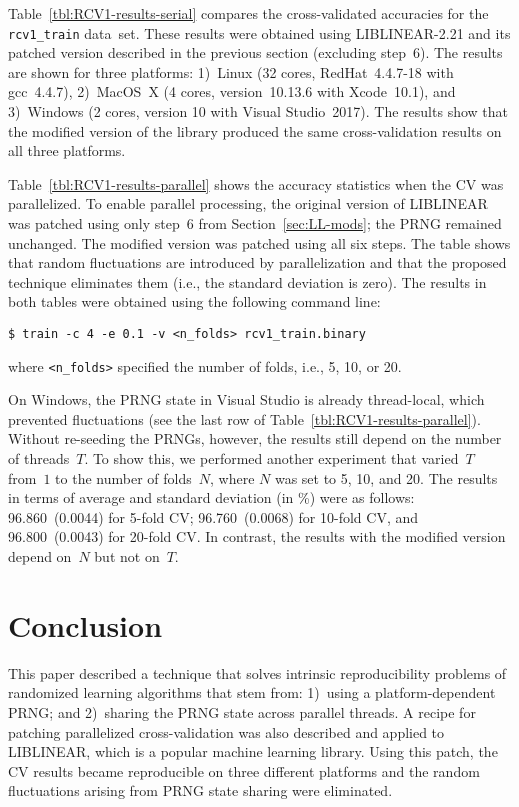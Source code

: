 Table~\ref{tbl:RCV1-results-serial} compares the cross-validated
accuracies for the \verb|rcv1_train| data~set\supercite{lewis2004rcv1}.
These results were obtained using LIBLINEAR-2.21 and its patched version
described in the previous section (excluding step~6). The results are shown for three platforms:
1)~Linux (32 cores, RedHat~4.4.7-18 with gcc~4.4.7), \mbox{2) MacOS X} (4 cores,
version~10.13.6 with Xcode~10.1), and \mbox{3) Windows} (2 cores, version 10
with Visual Studio~2017). The results show that the modified version of
the library produced the same cross-validation results on all three platforms.

\smallskip
Table~\ref{tbl:RCV1-results-parallel} shows the accuracy statistics when the CV
was parallelized. To enable parallel processing, the original
version of LIBLINEAR was patched using only step~6 from Section~\ref{sec:LL-mods};
the PRNG remained unchanged. The modified
version was patched using all six steps.
The table shows that random fluctuations
are introduced by parallelization and that the proposed technique eliminates
them (i.e., the standard deviation is zero).
The results in both tables were obtained using the following command line:
\begin{Verbatim}[fontsize=\small]
$ train -c 4 -e 0.1 -v <n_folds> rcv1_train.binary
\end{Verbatim}
where {\small\verb|<n_folds>|} specified the number of folds, i.e., 5, 10, or 20.

\smallskip
On Windows, the PRNG
state in Visual Studio is already thread-local, which prevented fluctuations
(see the last row of Table~\ref{tbl:RCV1-results-parallel}).
Without re-seeding the PRNGs, however,
the results still depend on the number of threads~$T$.
To show this, we performed another experiment that varied~$T$ from~$1$
to the number of folds~$N$, where $N$ was set to 5, 10, and 20.
The results in terms of average and standard deviation (in \%) were as follows:
96.860~(0.0044) for 5-fold CV; 96.760~(0.0068) for 10-fold CV, and
96.800~(0.0043) for 20-fold CV. In contrast, the results with the modified
version depend on~$N$ but not on~$T$.



\section{Conclusion}

This paper described a technique that solves intrinsic
reproducibility problems of randomized learning algorithms that stem from:
1)~using a platform-dependent PRNG; and 2)~sharing the PRNG state across parallel
threads.
A recipe for patching parallelized cross-validation was also described and
applied to LIBLINEAR, which is a popular machine learning
library. Using this patch, the CV results became
reproducible on three different platforms and the random fluctuations arising
from PRNG state sharing were eliminated.
